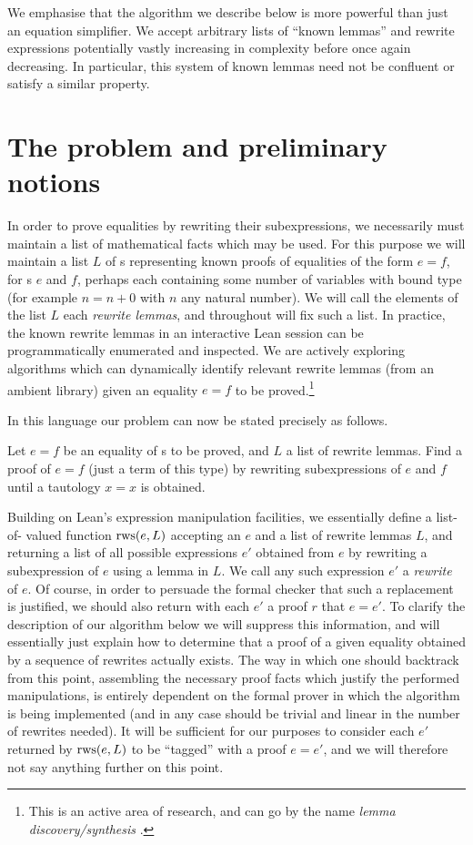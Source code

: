 \documentclass[12pt]{article}
\begin{document}
We emphasise that the algorithm we describe below is more powerful than just an equation simplifier. We accept arbitrary lists of ``known lemmas'' and rewrite expressions potentially vastly increasing in complexity before once again decreasing. In particular, this system of known lemmas need not be confluent or satisfy a similar property.

\section{The problem and preliminary notions}

In order to prove equalities by rewriting their subexpressions, we necessarily must maintain a list of mathematical facts which may be used. For this purpose we will maintain a list $L$ of s representing known proofs of equalities of the form $e = f$, for \expr{}s $e$ and $f$, perhaps each containing some number of variables with bound type (for example $n = n + 0$ with $n$ any natural number). We will call the elements of the list $L$ each \textit{rewrite lemmas}, and throughout will fix such a list. In practice, the known rewrite lemmas in an interactive Lean session can be programmatically enumerated and inspected. We are actively exploring algorithms which can dynamically identify relevant rewrite lemmas (from an ambient library) given an equality $e = f$ to be proved.\footnote{This is an active area of research, and can go by the name \textit{lemma discovery/synthesis} \cite{heras2013proof}.}

In this language our problem can now be stated precisely as follows.

\begin{prob}
  Let $e = f$ be an equality of \expr{}s to be proved, and $L$ a list of rewrite lemmas. Find a proof of $e = f$ (just a term of this type) by rewriting subexpressions of $e$ and $f$ until a tautology $x = x$ is obtained.
\end{prob}

Building on Lean's expression manipulation facilities, we essentially define a list-of-\expr{} valued function $\operatorname{rws}(e, L)$ accepting an  $e$ and a list of rewrite lemmas $L$, and returning a list of all possible expressions $e'$ obtained from $e$ by rewriting a subexpression of $e$ using a lemma in $L$. We call any such expression $e'$ a \textit{rewrite} of $e$. Of course, in order to persuade the formal checker that such a replacement is justified, we should also return with each \expr{} $e'$ a proof $r$ that $e = e'$. To clarify the description of our algorithm below we will suppress this information, and will essentially just explain how to determine that a proof of a given equality obtained by a sequence of rewrites actually exists. The way in which one should backtrack from this point, assembling the necessary proof facts which justify the performed manipulations, is entirely dependent on the formal prover in which the algorithm is being implemented (and in any case should be trivial and linear in the number of rewrites needed). It will be sufficient for our purposes to consider each $e'$ returned by $\operatorname{rws}(e, L)$ to be ``tagged'' with a proof $e = e'$, and we will therefore not say anything further on this point.
\end{document}
